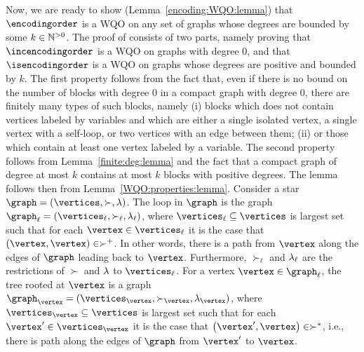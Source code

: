 Now, we are ready to show (Lemma~\ref{encoding:WQO:lemma})
that $\encodingorder$ is a WQO on any set of graphs
whose degrees are bounded by some $k\in{\mathbb N}^{>0}$.
%
The proof of consists of two parts, namely
proving that $\incencodingorder$ is a WQO on graphs with degree $0$,
and that $\isencodingorder$ is a WQO on graphs whose degrees are positive and bounded by $k$.
%
The first property follows from the fact that, even if there is no bound on the number
of blocks with degree $0$ in a compact graph with degree $0$, there are finitely many types of such blocks,
namely (i) blocks which does not contain vertices labeled by variables
and which are either a single isolated vertex, a single vertex with a self-loop, or
two vertices with an edge between them; (ii)
or those which contain at least one vertex labeled
by a variable.
%
The second property follows from Lemma~\ref{finite:deg:lemma} and the fact that a compact graph 
of degree at most $k$ contains at most $k$ blocks with positive degrees.
%
The lemma follows then from Lemma~\ref{WQO:properties:lemma}.
%
Consider a star $\graph=\tuple{\vertices,\succ,\labeling}$.
%
The loop in $\graph$ is the graph $\graph_{\ell}=\tuple{\vertices_{\ell},\succ_{\ell},\labeling_{\ell}}$,
where $\vertices_{\ell}\subseteq\vertices$ is largest set such that for each
$\vertex\in\vertices_{\ell}$ it is the case that $\tuple{\vertex,\vertex}\in\succ^+$.
%
In other words, there is a path from $\vertex$ along the edges of
$\graph$ leading back to $\vertex$.
%
Furthermore, $\succ_{\ell}$ and $\lambda_{\ell}$ are the restrictions of
$\succ$ and $\lambda$ to $\vertices_{\ell}$.
%
For a vertex $\vertex\in\graph_{\ell}$, the tree rooted at $\vertex$
is a graph $\graph_{\vertex}=\tuple{\vertices_{\vertex},\succ_{\vertex },\labeling_{\vertex}}$,
where $\vertices_{\vertex}\subseteq\vertices$ is largest set such that for each
$\vertex'\in\vertices_{\vertex}$ it is the case that $\tuple{\vertex',\vertex}\in\succ^*$,
i.e., there is path along the edges of $\graph$ from $\vertex'$ to $\vertex$.
%

